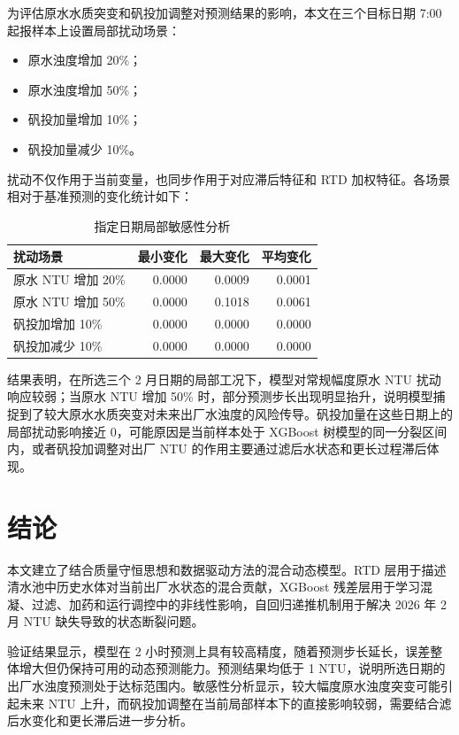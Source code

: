\documentclass[UTF8,a4paper,12pt]{ctexart}
\begin{document}
为评估原水水质突变和矾投加调整对预测结果的影响，本文在三个目标日期 7:00 起报样本上设置局部扰动场景：

\begin{itemize}
  \item 原水浊度增加 20\%；
  \item 原水浊度增加 50\%；
  \item 矾投加量增加 10\%；
  \item 矾投加量减少 10\%。
\end{itemize}

扰动不仅作用于当前变量，也同步作用于对应滞后特征和 RTD 加权特征。各场景相对于基准预测的变化统计如下：

\begin{table}[h]
\centering
\begin{tabular}{lrrr}
\toprule
扰动场景 & 最小变化 & 最大变化 & 平均变化 \\
\midrule
原水 NTU 增加 20\% & 0.0000 & 0.0009 & 0.0001 \\
原水 NTU 增加 50\% & 0.0000 & 0.1018 & 0.0061 \\
矾投加增加 10\% & 0.0000 & 0.0000 & 0.0000 \\
矾投加减少 10\% & 0.0000 & 0.0000 & 0.0000 \\
\bottomrule
\end{tabular}
\caption{指定日期局部敏感性分析}
\end{table}

结果表明，在所选三个 2 月日期的局部工况下，模型对常规幅度原水 NTU 扰动响应较弱；当原水 NTU 增加 50\% 时，部分预测步长出现明显抬升，说明模型捕捉到了较大原水水质突变对未来出厂水浊度的风险传导。矾投加量在这些日期上的局部扰动影响接近 0，可能原因是当前样本处于 XGBoost 树模型的同一分裂区间内，或者矾投加调整对出厂 NTU 的作用主要通过滤后水状态和更长过程滞后体现。

\section{结论}

本文建立了结合质量守恒思想和数据驱动方法的混合动态模型。RTD 层用于描述清水池中历史水体对当前出厂水状态的混合贡献，XGBoost 残差层用于学习混凝、过滤、加药和运行调控中的非线性影响，自回归递推机制用于解决 2026 年 2 月 NTU 缺失导致的状态断裂问题。

验证结果显示，模型在 2 小时预测上具有较高精度，随着预测步长延长，误差整体增大但仍保持可用的动态预测能力。预测结果均低于 1 NTU，说明所选日期的出厂水浊度预测处于达标范围内。敏感性分析显示，较大幅度原水浊度突变可能引起未来 NTU 上升，而矾投加调整在当前局部样本下的直接影响较弱，需要结合滤后水变化和更长滞后进一步分析。
\end{document}
